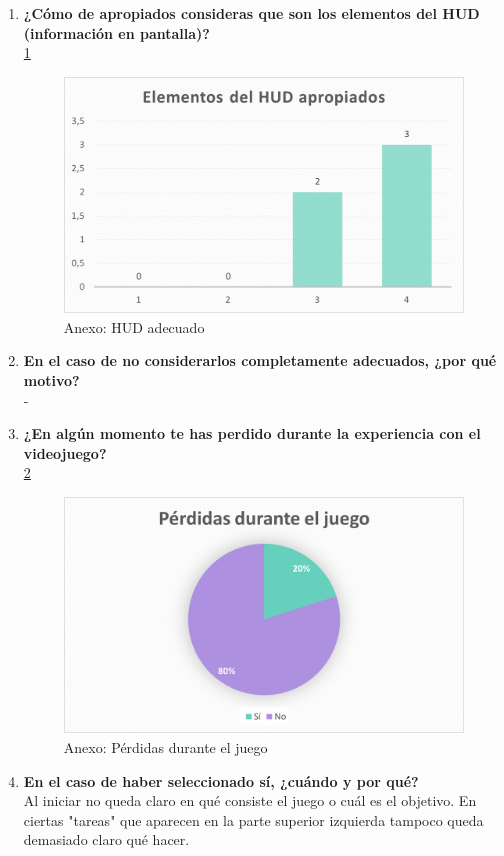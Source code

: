 \documentclass[12pt, a4paper,twoside,titlepage]{book}
\begin{document}
\begin{enumerate}[label=\textbf{\arabic*}.]
	 \item \textbf{¿Cómo de apropiados consideras que son los elementos del HUD (información en pantalla)?}\\	
		\ref{fig:anexHUD}
	\begin{figure}
	 	\centering
	 	\includegraphics[width=.8\linewidth]{Anexo Demo/5AnexDemo_HUD}
	 	\caption{Anexo: HUD adecuado}
	 	\label{fig:anexHUD}
	 \end{figure}
	 
	 \item \textbf{En el caso de no considerarlos completamente adecuados, ¿por qué motivo?}\\
	 	- 
	 
	 \item \textbf{¿En algún momento te has perdido durante la experiencia con el videojuego?}\\
	 \ref{fig:anexPerdi}
	 	 \begin{figure}
	 	\centering
	 	\includegraphics[width=.8\linewidth]{Anexo Demo/6AnexDemo_perdido}
	 	\caption{Anexo: Pérdidas durante el juego}
	 	\label{fig:anexPerdi}
	 \end{figure}
 
	 \item \textbf{En el caso de haber seleccionado sí, ¿cuándo y por qué?}\\
		Al iniciar no queda claro en qué consiste el juego o cuál es el objetivo. En ciertas "tareas" que aparecen en la parte superior izquierda tampoco queda demasiado claro qué hacer.
	 

\end{enumerate}
\end{document}
